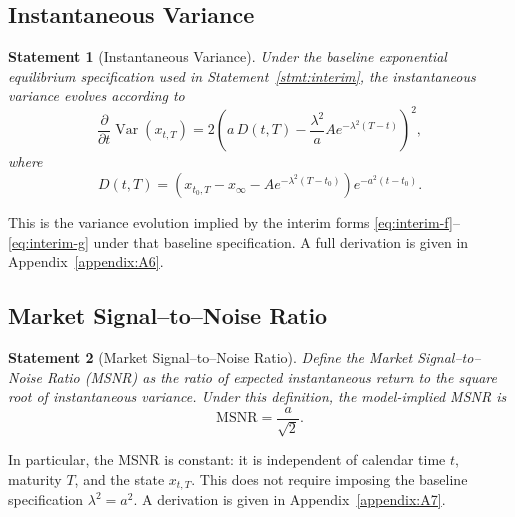 \documentclass[12pt]{article}
\theoremstyle{statementstyle}
\newtheorem{statement}{Statement}[section]
\begin{document}
\subsection{Instantaneous Variance}

\begin{statement}[Instantaneous Variance]
\label{stmt:variance}
\emph{
Under the baseline exponential equilibrium specification used in
Statement~\ref{stmt:interim}, the instantaneous variance evolves according to
}
\begin{equation}
\frac{\partial}{\partial t}\operatorname{Var}(x_{t,T})
=
2\left(
a\,D(t,T)
-
\frac{\lambda^{2}}{a}A e^{-\lambda^{2}(T-t)}
\right)^{2},
\tag{3.6.1}\label{eq:variance}
\end{equation}
where
\begin{equation}
D(t,T)
=
\left(
x_{t_{0},T}
-
x_{\infty}
-
A e^{-\lambda^{2}(T-t_{0})}
\right)
e^{-a^{2}(t-t_{0})}.
\tag{3.6.2}\label{eq:D-def}
\end{equation}
\end{statement}

\medskip

This is the variance evolution implied by the interim forms
\eqref{eq:interim-f}--\eqref{eq:interim-g} under that baseline
specification. A full derivation is given in Appendix~\ref{appendix:A6}.

\subsection{Market Signal--to--Noise Ratio}

\begin{statement}[Market Signal--to--Noise Ratio]
\label{stmt:msnr}
\emph{
Define the Market Signal--to--Noise Ratio (MSNR) as the ratio of expected
instantaneous return to the square root of instantaneous variance. Under this
definition, the model-implied MSNR is
}
\[
\mathrm{MSNR}
=
\frac{a}{\sqrt{2}}.
\tag{3.7.1}
\]
\end{statement}

\medskip

In particular, the MSNR is constant: it is independent of calendar time
\(t\), maturity \(T\), and the state \(x_{t,T}\). This does not require
imposing the baseline specification \(\lambda^{2}=a^{2}\).
A derivation is given in Appendix~\ref{appendix:A7}.
\end{document}
